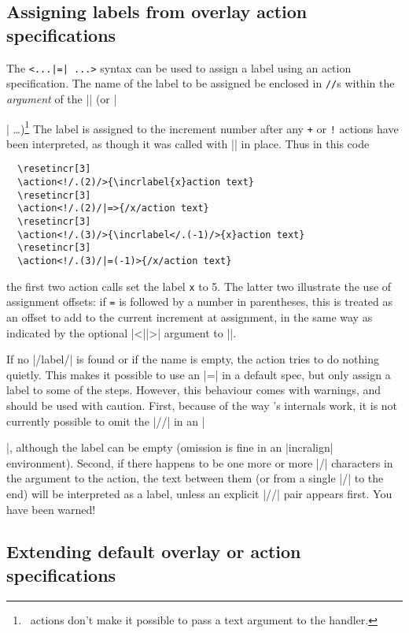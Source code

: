 \documentclass[a4paper]{ltxdoc}
\begin{document}
\subsection{Assigning labels from overlay action specifications}

The \verb^<...|=^\verb^| ...>^ syntax can be used to assign
a label using an action specification.  The name of the label to be assigned be
enclosed in \texttt{//}s within the \emph{argument} of the |\action| (or |\item|
\dots)\footnote{\beamer\ actions don't make it possible to pass a text argument
  to the handler.}  The label is assigned to the increment number after any
\texttt{+} or \texttt{!} actions have been interpreted, as though it was called
with |\incrlabel| in place.  Thus in this code \example
\begin{verbatim}
  \resetincr[3]
  \action<!/.(2)/>{\incrlabel{x}action text}
  \resetincr[3]
  \action<!/.(2)/|=>{/x/action text}
  \resetincr[3]
  \action<!/.(3)/>{\incrlabel</.(-1)/>{x}action text}
  \resetincr[3]
  \action<!/.(3)/|=(-1)>{/x/action text}
\end{verbatim}
the first two action calls set the label \texttt{x} to 5.  The latter two
illustrate the use of assignment offsets: if \texttt{=} is followed by a number
in parentheses, this is treated as an offset to add to the current increment at
assignment, in the same way as indicated by the optional |<||>|
argument to |\incrlabel|.

If no |/label/| is found or if the name is empty, the action tries to do nothing
quietly.  This makes it possible to use an |=| in a default spec, but only
assign a label to some of the steps.  However, this behaviour comes with
warnings, and should be used with caution.  First, because of the way \beamer's
internals work, it is not currently possible to omit the |//| in an |\item|,
although the label can be empty (omission is fine in an |incralign|
environment).  Second, if there happens to be one more or more |/| characters in
the argument to the action, the text between them (or from a single |/| to the
end) will be interpreted as a label, unless an explicit |//| pair appears first.
You have been warned!

\subsection{Extending default overlay or action specifications}
\end{document}
